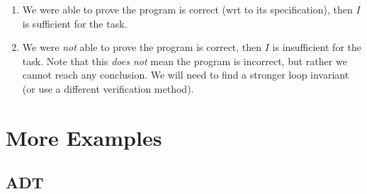 \documentclass[oneside,11pt,dvipsnames]{book}
\begin{document}
\begin{enumerate}
\item We were able to prove the program is correct (wrt to its specification), then $I$ is sufficient for the task. 
\item We were \emph{not} able to prove the program is correct, then $I$ is insufficient for the task.  Note that this \emph{does not} mean the program is incorrect, but rather we cannot reach any conclusion. We will need to find a stronger loop invariant (or use a different verification method).
\end{enumerate}




\chapter{More Examples}
\section{ADT}
\end{document}
